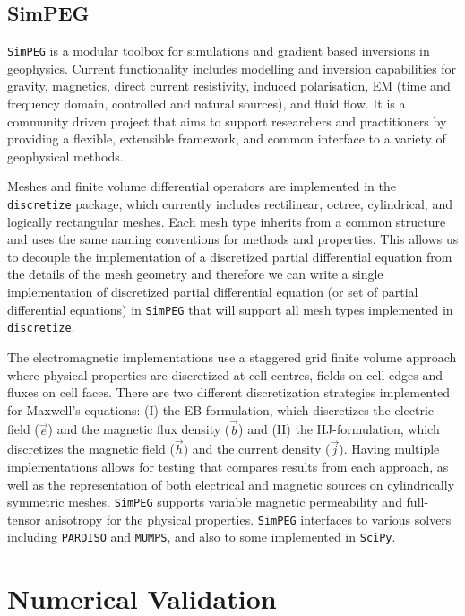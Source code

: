 \documentclass[a4paper, extra, camera,%
]{gji}
\newcommand{\simpeg}{\texttt{SimPEG}\xspace}
\newcommand{\discretize}{\texttt{discretize}\xspace}
\begin{document}
\subsection{SimPEG}

\simpeg is a modular toolbox for simulations and gradient based inversions in geophysics. Current functionality includes modelling and inversion capabilities for gravity, magnetics, direct current resistivity, induced polarisation, EM (time and frequency domain, controlled and natural sources), and fluid flow. It is a community driven project that aims to support researchers and practitioners by providing a flexible, extensible framework, and common interface to a variety of geophysical methods.

Meshes and finite volume differential operators are implemented in the \discretize package, which currently includes rectilinear, octree, cylindrical, and logically rectangular meshes. Each mesh type inherits from a common structure and uses the same naming conventions for methods and properties. This allows us to decouple the implementation of a discretized partial differential equation from the details of the mesh geometry and therefore we can write a single implementation of discretized partial differential equation (or set of partial differential equations) in \simpeg that will support all mesh types implemented in \discretize.

The electromagnetic implementations use a staggered grid finite volume approach where physical properties are discretized at cell centres, fields on cell edges and fluxes on cell faces. There are two different discretization strategies implemented for Maxwell's equations: (I) the EB-formulation, which discretizes the electric field ($\vec{e}$) and the magnetic flux density ($\vec{b}$) and (II) the HJ-formulation, which discretizes the magnetic field ($\vec{h}$) and the current density ($\vec{j}$). Having multiple implementations allows for testing that compares results from each approach, as well as the representation of both electrical and magnetic sources on cylindrically symmetric meshes. \simpeg supports variable magnetic permeability and full-tensor anisotropy for the physical properties. \simpeg interfaces to various solvers including \texttt{PARDISO} and \texttt{MUMPS}, and also to some implemented in \texttt{SciPy}.

\section{Numerical Validation}
\end{document}
